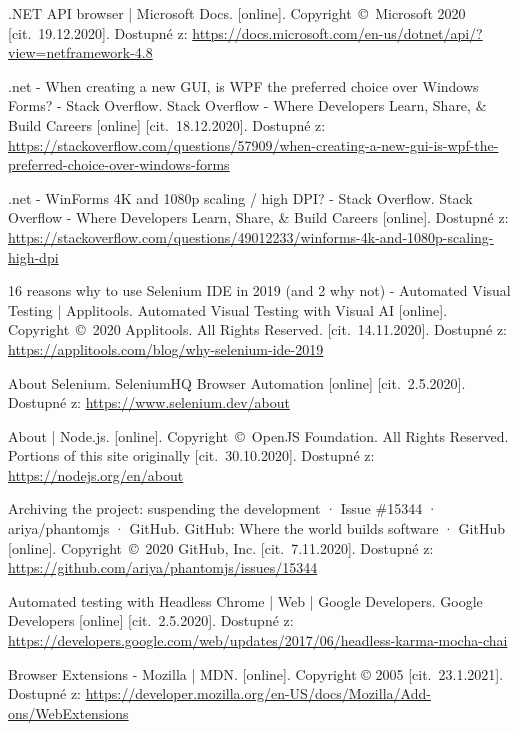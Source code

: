 \newpage
{}
\begin{thebibliography}{99}

 .NET API browser | Microsoft Docs. [online]. Copyright~©~Microsoft 2020 [cit.~19.12.2020]. Dostupné z: \url{https://docs.microsoft.com/en-us/dotnet/api/?view=netframework-4.8}

 .net - When creating a new GUI, is WPF the preferred choice over Windows Forms? - Stack Overflow. Stack Overflow - Where Developers Learn, Share, \& Build Careers [online] [cit.~18.12.2020]. Dostupné z: \url{https://stackoverflow.com/questions/57909/when-creating-a-new-gui-is-wpf-the-preferred-choice-over-windows-forms}

 .net - WinForms 4K and 1080p scaling / high DPI? - Stack Overflow. Stack Overflow - Where Developers Learn, Share, \& Build Careers [online]. Dostupné z: \url{https://stackoverflow.com/questions/49012233/winforms-4k-and-1080p-scaling-high-dpi}

 16 reasons why to use Selenium IDE in 2019 (and 2 why not) - Automated Visual Testing | Applitools. Automated Visual Testing with Visual AI [online]. Copyright~©~2020 Applitools. All Rights Reserved. [cit.~14.11.2020]. Dostupné z: \url{https://applitools.com/blog/why-selenium-ide-2019}

 About Selenium. SeleniumHQ Browser Automation [online] [cit.~2.5.2020]. Dostupné z: \url{https://www.selenium.dev/about}

 About | Node.js. [online]. Copyright~©~OpenJS Foundation. All Rights Reserved. Portions of this site originally [cit.~30.10.2020]. Dostupné z: \url{https://nodejs.org/en/about}

 Archiving the project: suspending the development · Issue \#15344 · ariya/phantomjs · GitHub. GitHub: Where the world builds software · GitHub [online]. Copyright~©~2020 GitHub, Inc. [cit.~7.11.2020]. Dostupné z: \url{https://github.com/ariya/phantomjs/issues/15344}

 Automated testing with Headless Chrome  |  Web  |  Google Developers. Google Developers [online] [cit.~2.5.2020]. Dostupné z: \url{https://developers.google.com/web/updates/2017/06/headless-karma-mocha-chai}

Browser Extensions - Mozilla | MDN. [online]. Copyright © 2005 [cit.~23.1.2021]. Dostupné z: \url{https://developer.mozilla.org/en-US/docs/Mozilla/Add-ons/WebExtensions}


\end{thebibliography}
